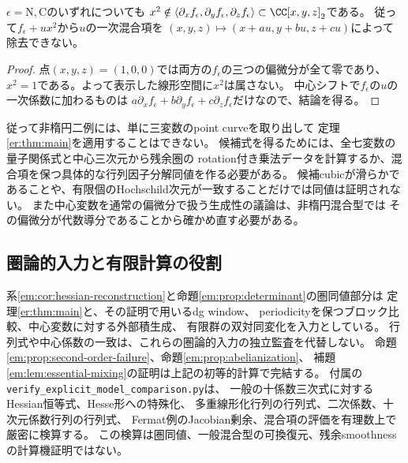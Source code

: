 \begin{lemma}
\label{em:lem:essential-mixing}
$\epsilon=\mathrm N,\mathrm C$のいずれについても
$x^2\notin\langle\partial_xf_\epsilon,\partial_yf_\epsilon,
\partial_zf_\epsilon\rangle\subset\CC[x,y,z]_2$である。
従って$f_\epsilon+ux^2$から$u$の一次混合項を
$(x,y,z)\mapsto(x+a u,y+b u,z+c u)$によって除去できない。
\end{lemma}
\begin{proof}
点$(x,y,z)=(1,0,0)$では両方の$f_\epsilon$の三つの偏微分が全て零であり、
$x^2=1$である。よって表示した線形空間に$x^2$は属さない。
中心シフトで$f_\epsilon$の$u$の一次係数に加わるものは
$a\partial_x f_\epsilon+b\partial_y f_\epsilon+c\partial_z f_\epsilon$だけなので、結論を得る。
\end{proof}

従って非楕円二例には、単に三変数のpoint curveを取り出して
定理\ref{er:thm:main}を適用することはできない。
候補式を得るためには、全七変数の量子関係式と中心三次元から残余圏の
rotation付き乗法データを計算するか、混合項を保つ具体的な行列因子分解同値を作る必要がある。
候補cubicが滑らかであることや、有限個のHochschild次元が一致することだけでは同値は証明されない。
また中心変数を通常の偏微分で扱う生成性の議論は、非楕円混合型では
その偏微分が代数導分であることから確かめ直す必要がある。

\subsection{圏論的入力と有限計算の役割}

系\ref{em:cor:hessian-reconstruction}と命題\ref{em:prop:determinant}の圏同値部分は
定理\ref{er:thm:main}と、その証明で用いるdg window、
periodicityを保つブロック比較、中心変数に対する外部積生成、
有限群の双対同変化\cite[Theorem 4.2, Section 8]{Elagin}を入力としている。
行列式や中心係数の一致は、これらの圏論的入力の独立監査を代替しない。
命題\ref{em:prop:second-order-failure}、命題\ref{em:prop:abelianization}、
補題\ref{em:lem:essential-mixing}の証明は上記の初等的計算で完結する。
付属の\texttt{verify\_explicit\_model\_comparison.py}は、
一般の十係数三次式に対するHessian恒等式、Hesse形への特殊化、
多重線形化行列の行列式、二次係数、十次元係数行列の行列式、
Fermat例のJacobian剰余、混合項の評価を有理数上で厳密に検算する。
この検算は圏同値、一般混合型の可換復元、残余smoothnessの計算機証明ではない。

